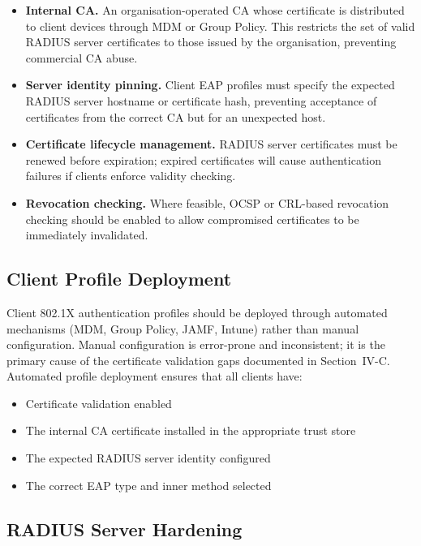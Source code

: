 \documentclass[journal]{IEEEtran}
\begin{document}
\begin{itemize}
  \item \textbf{Internal CA.} An organisation-operated CA whose certificate is
        distributed to client devices through MDM or Group Policy. This restricts
        the set of valid RADIUS server certificates to those issued by the
        organisation, preventing commercial CA abuse.
  \item \textbf{Server identity pinning.} Client EAP profiles must specify the
        expected RADIUS server hostname or certificate hash, preventing acceptance
        of certificates from the correct CA but for an unexpected host.
  \item \textbf{Certificate lifecycle management.} RADIUS server certificates
        must be renewed before expiration; expired certificates will cause
        authentication failures if clients enforce validity checking.
  \item \textbf{Revocation checking.} Where feasible, OCSP or CRL-based revocation
        checking should be enabled to allow compromised certificates to be
        immediately invalidated.
\end{itemize}

\subsection{Client Profile Deployment}

Client 802.1X authentication profiles should be deployed through automated
mechanisms (MDM, Group Policy, JAMF, Intune) rather than manual configuration.
Manual configuration is error-prone and inconsistent; it is the primary cause of
the certificate validation gaps documented in Section~IV-C. Automated profile
deployment ensures that all clients have:

\begin{itemize}
  \item Certificate validation enabled
  \item The internal CA certificate installed in the appropriate trust store
  \item The expected RADIUS server identity configured
  \item The correct EAP type and inner method selected
\end{itemize}

\subsection{RADIUS Server Hardening}
\end{document}

